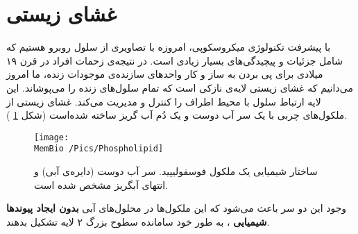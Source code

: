 \setRL
{} 


\section{
غشای زیستی
}
با پیشرفت تکنولوژی میکروسکوپی،‌ امروزه با تصاویری از سلول روبرو هستیم که شامل جزئیات و پیچیدگی‌های بسیار زیادی است. در نتیجه‌ی زحمات افراد در قرن ۱۹ میلادی برای پی بردن به ساز و کار واحد‌های سازنده‌ی موجودات زنده، ما امروز می‌دانیم که غشای زیستی لایه‌ی نازکی است که تمام سلول‌های زنده را می‌پوشاند. این لایه ارتباط سلول با محیط اطراف را کنترل و مدیریت می‌کند. غشای زیستی از ملکول‌های چربی
با یک سر آب دوست
 و یک دُم آب گریز
 ساخته شده‌است (شکل
\ref{fig:phospholipid}
).
 
 \begin{figure}[h]
\begin{center}
\texttt{[image: \\MemBio /Pics/Phospholipid]}
\caption{
ساختار شیمیایی یک ملکول فوسفولیپید. سر آب دوست (دایره‌ی آبی) و  انتهای آبگریز مشخص شده است.
}
\label{fig:phospholipid}
\end{center}
\end{figure}
 
 
  وجود این دو سر باعث می‌شود که این ملکول‌ها در محلول‌های آبی
\textbf{بدون ایجاد پیوندها شیمیایی}
، به طور خود سامانده
 سطوح بزرگ ۲ لایه تشکیل بدهند.  